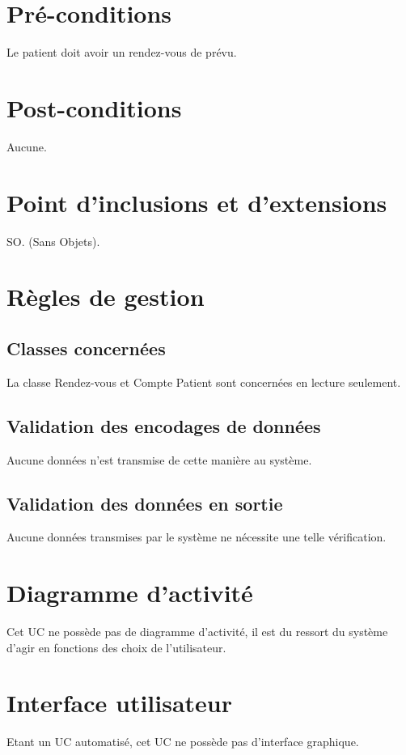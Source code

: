 \documentclass[a4paper, 11pt]{report}
\begin{document}
\section{Pré-conditions}

Le patient doit avoir un rendez-vous de prévu.

\section{Post-conditions}

Aucune.

\section{Point d'inclusions et d'extensions}

SO. (Sans Objets).
\section{Règles de gestion}

\subsection{Classes concernées}

La classe Rendez-vous et Compte Patient sont concernées en lecture seulement.

\subsection{Validation des encodages de données}

Aucune données n'est transmise de cette manière au système.

\subsection{Validation des données en sortie}

Aucune données transmises par le système ne nécessite une telle vérification.

\section{Diagramme d'activité}

Cet UC ne possède pas de diagramme d'activité, il est du ressort du système d'agir en fonctions
des choix de l'utilisateur.

\section{Interface utilisateur}

Etant un UC automatisé, cet UC ne possède pas d'interface graphique.
\end{document}
